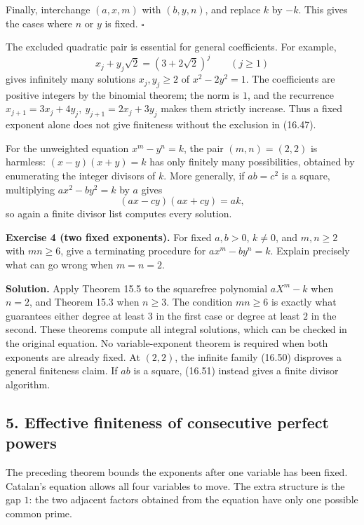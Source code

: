 \documentclass[
  11pt,
  a4paper,
]{article}
\begin{document}
Finally, interchange \((a,x,m)\) with \((b,y,n)\), and replace \(k\) by
\(-k\). This gives the cases where \(n\) or \(y\) is fixed. \(\square\)

The excluded quadratic pair is essential for general coefficients. For
example, \[
 x_j+y_j\sqrt2=(3+2\sqrt2)^j\qquad(j\geq1)
 \tag{16.50}
\] gives infinitely many solutions \(x_j,y_j\geq2\) of \(x^2-2y^2=1\).
The coefficients are positive integers by the binomial theorem; the norm
is \(1\), and the recurrence \(x_{j+1}=3x_j+4y_j,\ y_{j+1}=2x_j+3y_j\)
makes them strictly increase. Thus a fixed exponent alone does not give
finiteness without the exclusion in (16.47).

For the unweighted equation \(x^m-y^n=k\), the pair \((m,n)=(2,2)\) is
harmless: \((x-y)(x+y)=k\) has only finitely many possibilities,
obtained by enumerating the integer divisors of \(k\). More generally,
if \(ab=c^2\) is a square, multiplying \(ax^2-by^2=k\) by \(a\) gives \[
 (ax-cy)(ax+cy)=ak,
 \tag{16.51}
\] so again a finite divisor list computes every solution.

\textbf{Exercise 4 (two fixed exponents).} For fixed \(a,b>0\),
\(k\ne0\), and \(m,n\geq2\) with \(mn\geq6\), give a terminating
procedure for \(ax^m-by^n=k\). Explain precisely what can go wrong when
\(m=n=2\).

\textbf{Solution.} Apply Theorem 15.5 to the squarefree polynomial
\(aX^m-k\) when \(n=2\), and Theorem 15.3 when \(n\geq3\). The condition
\(mn\geq6\) is exactly what guarantees either degree at least \(3\) in
the first case or degree at least \(2\) in the second. These theorems
compute all integral solutions, which can be checked in the original
equation. No variable-exponent theorem is required when both exponents
are already fixed. At \((2,2)\), the infinite family (16.50) disproves a
general finiteness claim. If \(ab\) is a square, (16.51) instead gives a
finite divisor algorithm.

\subsection{5. Effective finiteness of consecutive perfect
powers}\label{effective-finiteness-of-consecutive-perfect-powers}

The preceding theorem bounds the exponents after one variable has been
fixed. Catalan's equation allows all four variables to move. The extra
structure is the gap \(1\): the two adjacent factors obtained from the
equation have only one possible common prime.
\end{document}
